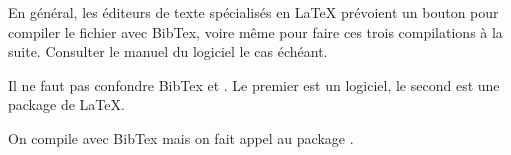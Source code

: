 En général, les éditeurs de texte spécialisés en \LaTeX{} prévoient un bouton pour compiler le fichier  avec BibTex, voire même pour faire ces trois compilations à la suite. Consulter le manuel du logiciel le cas échéant.

\begin{attention}

Il ne faut pas confondre BibTex et . Le premier est un logiciel, le second est une package de \LaTeX{}.

On compile avec BibTex mais on fait appel au package .

\end{attention}





